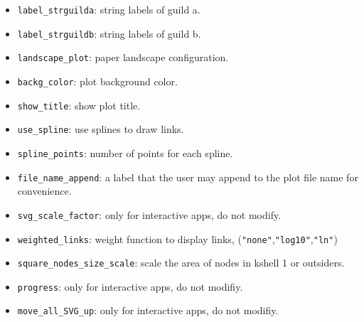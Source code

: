 \documentclass[12pt]{article}
\begin{document}
\begin{itemize}
\item \texttt{label\_strguilda}: string labels of guild a.

\item \texttt{label\_strguildb}: string labels of guild b.

\item \texttt{landscape\_plot}: paper landscape configuration.

\item \texttt{backg\_color}: plot background color.

\item \texttt{show\_title}: show plot title.

\item \texttt{use\_spline}: use splines to draw links.

\item \texttt{spline\_points}: number of points for each spline.

\item \texttt{file\_name\_append}: a label that the user may append to the plot file name for convenience.

\item \texttt{svg\_scale\_factor}: only for interactive apps, do not modify.

\item \texttt{weighted\_links}: weight function to display links, (\texttt{"none"},\texttt{"log10"},\texttt{"ln"})

\item \texttt{square\_nodes\_size\_scale}: scale the area of nodes in kshell 1 or outsiders.

\item \texttt{progress}: only for interactive apps, do not modifiy.

\item \texttt{move\_all\_SVG\_up}: only for interactive apps, do not modifiy.

\end{itemize}


\normalsize

\clearpage
\printbibliography[heading=bibintoc]
\end{document}
